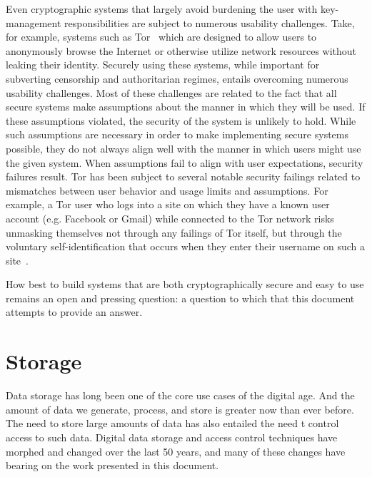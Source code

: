 Even cryptographic systems that largely avoid burdening the user with
key-management responsibilities are subject to numerous usability
challenges. Take, for example, systems such as
Tor~\cite{dingledine2004} which are designed to allow users to
anonymously browse the Internet or otherwise utilize network resources
without leaking their identity. Securely using these systems, while
important for subverting censorship and authoritarian regimes, entails
overcoming numerous usability challenges. Most of these challenges are
related to the fact that all secure systems make assumptions about the
manner in which they will be used. If these assumptions violated, the
security of the system is unlikely to hold. While such assumptions are
necessary in order to make implementing secure systems possible, they
do not always align well with the manner in which users might use the
given system. When assumptions fail to align with user expectations,
security failures result. Tor has been subject to several notable
security failings related to mismatches between user behavior and
usage limits and assumptions. For example, a Tor user who logs into a
site on which they have a known user account (e.g. Facebook or Gmail)
while connected to the Tor network risks unmasking themselves not
through any failings of Tor itself, but through the voluntary
self-identification that occurs when they enter their username on such
a site~\cite{goodin-dreadpirate}.

How best to build systems that are both cryptographically secure and
easy to use remains an open and pressing question: a question to which
that this document attempts to provide an answer.

\section{Storage}
\label{chap:background:storage}

Data storage has long been one of the core use cases of the digital
age. And the amount of data we generate, process, and store is greater
now than ever before. The need to store large amounts of data has also
entailed the need t control access to such data. Digital data storage
and access control techniques have morphed and changed over the last
50 years, and many of these changes have bearing on the work presented
in this document.


